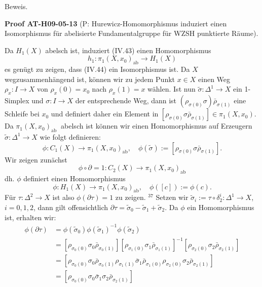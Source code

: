 \documentclass[10pt, letterpaper]{article}
\newcommand{\CustomHeading}[3]{%
  \par\medskip\noindent%
  \textbf{#1 #2} \textnormal{(#3)}.\enskip%
}
\newenvironment{PROOF}[2]{\begin{unitbox}\CustomHeading{Proof}{#1}{#2}}{\end{unitbox}}
\begin{document}
Beweis. 

\begin{PROOF}{AT-H09-05-13}{P: Hurewicz-Homomorphismus induziert einen Isomorphismus für abelisierte Fundamentalgruppe für WZSH punktierte Räume}
Da $H_1(X)$ abelsch ist, induziert (IV.43) einen Homomorphismus
$$
h_1: \pi_1\left(X, x_0\right)_{\mathrm{ab}} \rightarrow H_1(X)
$$
es genügt zu zeigen, dass (IV.44) ein Isomorphismus ist. Da $X$ wegzusammenhängend ist, können wir zu jedem Punkt $x \in X$ einen Weg $\rho_x: I \rightarrow X$ von $\rho_x(0)=x_0$ nach $\rho_x(1)=x$ wählen. Ist nun $\tilde{\sigma}: \Delta^1 \rightarrow X$ ein 1-Simplex und $\sigma: I \rightarrow X$ der entsprechende Weg, dann ist $\left(\rho_{\sigma(0)} \sigma\right) \bar{\rho}_{\sigma(1)}$ eine Schleife bei $x_0$ und definiert daher ein Element in $\left[\rho_{\sigma(0)} \sigma \bar{\rho}_{\sigma(1)}\right] \in \pi_1\left(X, x_0\right)$. Da $\pi_1\left(X, x_0\right)_{\text {ab }}$ abelsch ist können wir einen Homomorphismus auf Erzeugern $\tilde{\sigma}: \Delta^1 \rightarrow X$ wie folgt definieren:
$$
\phi: C_1(X) \rightarrow \pi_1\left(X, x_0\right)_{\mathrm{ab}}, \quad \phi(\tilde{\sigma}):=\left[\rho_{\sigma(0)} \sigma \bar{\rho}_{\sigma(1)}\right] .
$$
Wir zeigen zunächst
$$
\phi \circ \partial=1: C_2(X) \rightarrow \pi_1\left(X, x_0\right)_{\mathrm{ab}}
$$
dh. $\phi$ definiert einen Homomorphismus
$$
\phi: H_1(X) \rightarrow \pi_1\left(X, x_0\right)_{\mathrm{ab}}, \quad \phi([c]):=\phi(c) .
$$
Für $\tau: \Delta^2 \rightarrow X$ ist also $\phi(\partial \tau)=1$ zu zeigen. ${ }^{37}$ Setzen wir $\tilde{\sigma}_i:=\tau \circ \delta_2^i: \Delta^1 \rightarrow X$, $i=0,1,2$, dann gilt offensichtlich $\partial \tau=\tilde{\sigma}_0-\tilde{\sigma}_1+\tilde{\sigma}_2$. Da $\phi$ ein Homomorphismus ist, erhalten wir:
$$
\begin{aligned}
\phi(\partial \tau) & =\phi\left(\tilde{\sigma}_0\right) \phi\left(\tilde{\sigma}_1\right)^{-1} \phi\left(\tilde{\sigma}_2\right) \\
& =\left[\rho_{\sigma_0(0)} \sigma_0 \bar{\rho}_{\sigma_0(1)}\right]\left[\rho_{\sigma_1(0)} \sigma_1 \bar{\rho}_{\sigma_1(1)}\right]^{-1}\left[\rho_{\sigma_2(0)} \sigma_2 \bar{\rho}_{\sigma_2(1)}\right] \\
& =\left[\rho_{\sigma_0(0)} \sigma_0 \bar{\rho}_{\sigma_0(1)} \rho_{\sigma_1(1)} \bar{\sigma}_1 \bar{\rho}_{\sigma_1(0)} \rho_{\sigma_2(0)} \sigma_2 \bar{\rho}_{\sigma_2(1)}\right] \\
& =\left[\rho_{\sigma_0(0)} \sigma_0 \bar{\sigma}_1 \sigma_2 \bar{\rho}_{\sigma_2(1)}\right] \\

\end{aligned}$$
\end{PROOF}
\end{document}
